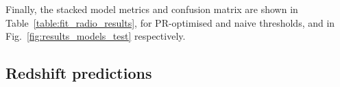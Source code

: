 \documentclass{aa}
\begin{document}
Finally, the stacked model metrics and confusion matrix are shown in Table~\ref{table:fit_radio_results}, for PR-optimised and naive thresholds, and in  Fig.~\ref{fig:results_models_test} respectively. 

\subsection{Redshift predictions}\label{sec:results_redshift}
\end{document}
